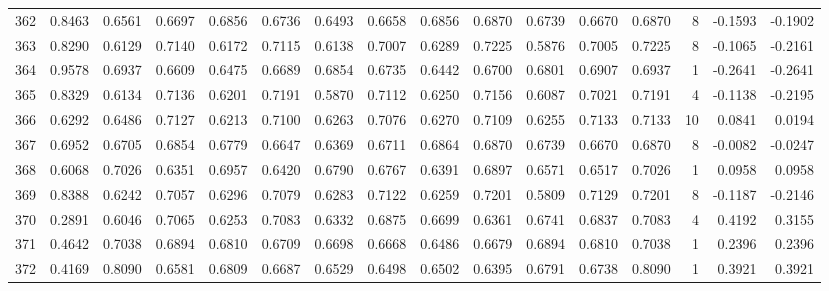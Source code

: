 \begin{tabular}{lrrrrrrrrrrrrrrr}
362 &      0.8463 &  0.6561 &  0.6697 &  0.6856 &  0.6736 &  0.6493 &  0.6658 &  0.6856 &  0.6870 &  0.6739 &   0.6670 &     0.6870 &      8 &                   -0.1593 &                    -0.1902 \\
363 &      0.8290 &  0.6129 &  0.7140 &  0.6172 &  0.7115 &  0.6138 &  0.7007 &  0.6289 &  0.7225 &  0.5876 &   0.7005 &     0.7225 &      8 &                   -0.1065 &                    -0.2161 \\
364 &      0.9578 &  0.6937 &  0.6609 &  0.6475 &  0.6689 &  0.6854 &  0.6735 &  0.6442 &  0.6700 &  0.6801 &   0.6907 &     0.6937 &      1 &                   -0.2641 &                    -0.2641 \\
365 &      0.8329 &  0.6134 &  0.7136 &  0.6201 &  0.7191 &  0.5870 &  0.7112 &  0.6250 &  0.7156 &  0.6087 &   0.7021 &     0.7191 &      4 &                   -0.1138 &                    -0.2195 \\
366 &      0.6292 &  0.6486 &  0.7127 &  0.6213 &  0.7100 &  0.6263 &  0.7076 &  0.6270 &  0.7109 &  0.6255 &   0.7133 &     0.7133 &     10 &                    0.0841 &                     0.0194 \\
367 &      0.6952 &  0.6705 &  0.6854 &  0.6779 &  0.6647 &  0.6369 &  0.6711 &  0.6864 &  0.6870 &  0.6739 &   0.6670 &     0.6870 &      8 &                   -0.0082 &                    -0.0247 \\
368 &      0.6068 &  0.7026 &  0.6351 &  0.6957 &  0.6420 &  0.6790 &  0.6767 &  0.6391 &  0.6897 &  0.6571 &   0.6517 &     0.7026 &      1 &                    0.0958 &                     0.0958 \\
369 &      0.8388 &  0.6242 &  0.7057 &  0.6296 &  0.7079 &  0.6283 &  0.7122 &  0.6259 &  0.7201 &  0.5809 &   0.7129 &     0.7201 &      8 &                   -0.1187 &                    -0.2146 \\
370 &      0.2891 &  0.6046 &  0.7065 &  0.6253 &  0.7083 &  0.6332 &  0.6875 &  0.6699 &  0.6361 &  0.6741 &   0.6837 &     0.7083 &      4 &                    0.4192 &                     0.3155 \\
371 &      0.4642 &  0.7038 &  0.6894 &  0.6810 &  0.6709 &  0.6698 &  0.6668 &  0.6486 &  0.6679 &  0.6894 &   0.6810 &     0.7038 &      1 &                    0.2396 &                     0.2396 \\
372 &      0.4169 &  0.8090 &  0.6581 &  0.6809 &  0.6687 &  0.6529 &  0.6498 &  0.6502 &  0.6395 &  0.6791 &   0.6738 &     0.8090 &      1 &                    0.3921 &                     0.3921 \\

\end{tabular}
